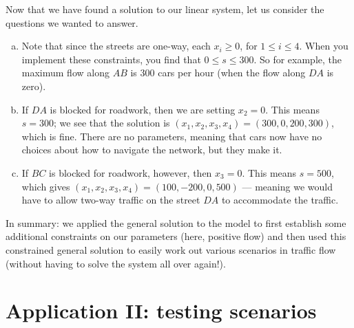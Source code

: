 \begin{myprob}
\begin{mysol}
Now that we have found a solution to our linear system, let us consider the questions we wanted to answer.
\begin{enumerate}[(a)] 
\item Note that since the streets are one-way, each $x_i\ge 0$, for $1\le i\le 4$. When you implement these constraints, you find that $0\le s\le 300$. So for example, the maximum flow along $AB$ is 300 cars per hour (when the flow along $DA$ is zero). 
\item If $DA$ is blocked for roadwork, then we are setting $x_2=0$. This means $s=300$; we see that the solution is
$(x_1,x_2,x_3,x_4) = (300,0,200,300)$, which is fine.  There are no parameters, meaning that cars now have no choices about how to navigate the network, but they make it.
\item If $BC$ is blocked for roadwork, however, then $x_3=0$.  This means $s=500$,
which gives $(x_1,x_2,x_3,x_4) = (100,-200,0,500)$ --- meaning we would have
to allow two-way traffic on the street $DA$ to accommodate the traffic.
\end{enumerate}
In summary:  we applied the general solution to the model to first establish some additional constraints on our parameters (here, positive flow) and then used this constrained general solution to easily work out
various scenarios in traffic flow (without having to solve the
system all over again!).
\end{mysol}\end{myprob}

\section{Application II: testing scenarios}

